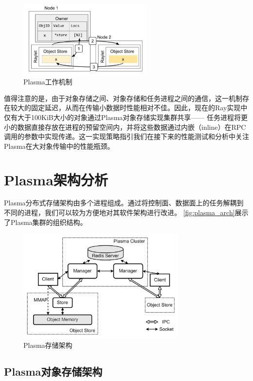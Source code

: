 \begin{figure}[h] 
    \centering
    \includegraphics[width=0.6\textwidth]{image/chap02/object_fetch.png}
    \caption{Plasma工作机制}
    \label{fig:object_fetch}
\end{figure}

值得注意的是，由于对象存储之间、对象存储和任务进程之间的通信，这一机制存在较大的固定延迟，从而在传输小数据时性能相对不佳。因此，现在的Ray实现中仅有大于100KiB大小的对象通过Plasma对象存储实现集群共享——
任务进程将更小的数据直接存放在进程的预留空间内，并将这些数据通过内嵌（inline）在RPC调用的参数中实现传递。这一实现策略指引我们在接下来的性能测试和分析中关注Plasma在大对象传输中的性能瓶颈。

\section{Plasma架构分析}

Plasma分布式存储架构由多个进程组成。通过将控制面、数据面上的任务解耦到不同的进程，我们可以较为方便地对其软件架构进行改进。
\autoref{fig:plasma_arch}展示了Plasma集群的组织结构。

\begin{figure}[h] 
    \centering
    \includegraphics[width=0.75\textwidth]{image/chap02/plasma_arch.png}
    \caption{Plasma存储架构}
    \label{fig:plasma_arch}
\end{figure}

\subsection{Plasma对象存储架构}

